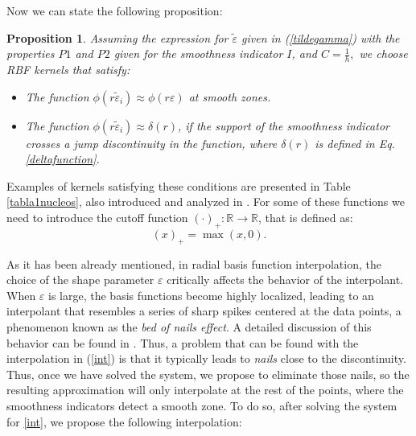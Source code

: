 \documentclass[preprint]{elsarticle}       %
\newtheorem{proposition}[theorem]{Proposition}
\begin{document}

Now we can state the following proposition:

\begin{proposition}\label{t1}
Assuming the expression for $\tilde\varepsilon$ given in (\ref{tildegamma}) with the properties $P1$ and $P2$ given for the smoothness indicator $I$, and $C=\frac{1}{h},$ we choose RBF kernels that satisfy:
\begin{itemize}
\item The function $\phi(r\tilde\varepsilon_i)\approx\phi(r\varepsilon)$  at smooth zones.
\item The function $\phi(r\tilde\varepsilon_i)\approx\delta(r)$, if the support of the smoothness indicator crosses a jump discontinuity in the function, where $\delta(r)$ is defined in Eq. \eqref{deltafunction}.


\end{itemize}
\end{proposition}
Examples of kernels satisfying these conditions are presented in Table \ref{tabla1nucleos}, also introduced and analyzed in \cite{Fasshauer2007}. For some of these functions we need to introduce the cutoff function $(\cdot)_+:\mathbb{R} \to \mathbb{R}$, that is defined as:
 \begin{equation*}
 (x)_+=\max(x, 0).
 \end{equation*}



 


As it has been already mentioned, in radial basis function  interpolation, the choice of the shape parameter $\varepsilon$ critically affects the behavior of the interpolant. When $\varepsilon$ is large, the basis functions become highly localized, leading to an interpolant that resembles a series of sharp spikes centered at the data points, a phenomenon known as the \textit{bed of nails effect}. A detailed discussion of this behavior can be found in \cite{Fasshauer2007}. Thus, a problem that can be found with the interpolation in (\ref{int}) is that it typically leads to {\it nails} close to the discontinuity. Thus, once we have solved the system, we propose to eliminate those nails, so the resulting approximation will only interpolate at the rest of the points, where the smoothness indicators detect a smooth zone. To do so, after solving the system for \eqref{int}, we propose the following interpolation:
\end{document}
